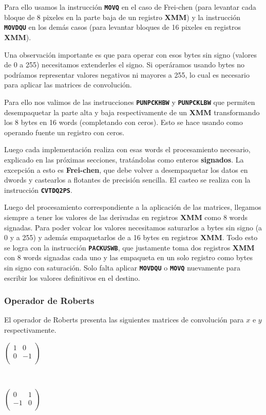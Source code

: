 Para ello usamos la instrucción \textbf{\texttt{MOVQ}} en el caso de Frei-chen
(para levantar cada bloque de 8 pixeles en la parte baja de un registro \textbf{XMM}) y la
instrucción \textbf{\texttt{MOVDQU}} en los demás casos (para levantar bloques de
16 pixeles en registros \textbf{XMM}).

Una observación importante es que para operar con esos bytes sin signo (valores de
0 a 255) necesitamos extenderles el signo. Si operáramos usando bytes no podríamos
representar valores negativos ni mayores a 255, lo cual es necesario para aplicar
las matrices de convolución.

Para ello nos valimos de las instrucciones \textbf{\texttt{PUNPCKHBW}} y 
\textbf{\texttt{PUNPCKLBW}} que permiten desempaquetar la parte alta y baja
respectivamente de un \textbf{XMM} transformando los 8 bytes en 16 words (completando con
ceros). Esto se hace usando como operando fuente un registro con ceros.

Luego cada implementación realiza con esas words el procesamiento necesario,
explicado en las próximas secciones, tratándolas como enteros \textbf{signados}.
La excepción a esto es \textbf{Frei-chen}, que debe volver a desempaquetar los datos
en dwords y castearlos a flotantes de precisión sencilla. El casteo se realiza con
la instrucción \textbf{\texttt{CVTDQ2PS}}.

Luego del procesamiento correspondiente a la aplicación de las matrices, llegamos
siempre a tener los valores de las derivadas en registros \textbf{XMM} como 8 words signadas.
Para poder volcar los valores necesitamos saturarlos a bytes sin signo (a 0 y a 255)
y además empaquetarlos de a 16 bytes en registros \textbf{XMM}. Todo esto se logra con la 
instrucción \textbf{\texttt{PACKUSWB}}, que justamente toma dos registros \textbf{XMM} con
8 words signadas cada uno y las empaqueta en un solo registro como bytes sin signo
con saturación. Solo falta aplicar \textbf{\texttt{MOVDQU}} o \textbf{\texttt{MOVQ}}
nuevamente para escribir los valores definitivos en el destino.


\subsubsection{Operador de Roberts}

El operador de Roberts presenta las siguientes matrices de convolución para $x$ e $y$ respectivamente.

\begin{center}
\begin{minipage}{0.30 \textwidth}
$\begin{pmatrix}
1 & 0 \\
0 & -1  \\
\end{pmatrix}$
\end{minipage}
\ \ 
 \begin{minipage}{0.30 \textwidth}
$\begin{pmatrix}
0 & 1 \\
-1 & 0 \\
\end{pmatrix}$
\end{minipage}
\end{center}

